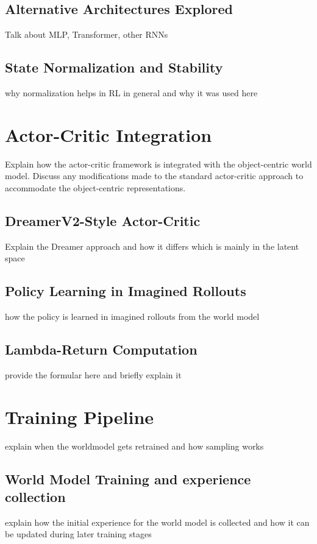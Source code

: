 \documentclass[
	english,
	ruledheaders=section,
	class=report,
	thesis={type=master},
	accentcolor=9c,
	custommargins=true,
	marginpar=false,
	parskip=half-,
	fontsize=11pt,
]{tudapub}
\begin{document}
\subsection{Alternative Architectures Explored}
\label{subsec:alternative_architectures}
Talk about MLP, Transformer, other RNNs


\subsection{State Normalization and Stability}
\label{subsec:normalization}
why normalization helps in RL in general and why it was used here

\section{Actor-Critic Integration}
\label{sec:actor_critic}
Explain how the actor-critic framework is integrated with the object-centric world model. 
Discuss any modifications made to the standard actor-critic approach to accommodate the 
object-centric representations.

\subsection{DreamerV2-Style Actor-Critic}
\label{subsec:dreamer_ac}
Explain the Dreamer approach and how it differs which is mainly in the latent space

\subsection{Policy Learning in Imagined Rollouts}
\label{subsec:imagined_rollouts}
how the policy is learned in imagined rollouts from the world model

\subsection{Lambda-Return Computation}
\label{subsec:lambda_returns}
provide the formular here and briefly explain it 

\section{Training Pipeline}
\label{sec:training_pipeline}
explain when the worldmodel gets retrained and how sampling works

\subsection{World Model Training and experience collection}
\label{subsec:world_model_training}
explain how the initial experience for the world model is collected and how it can be updated during later training stages
\end{document}
